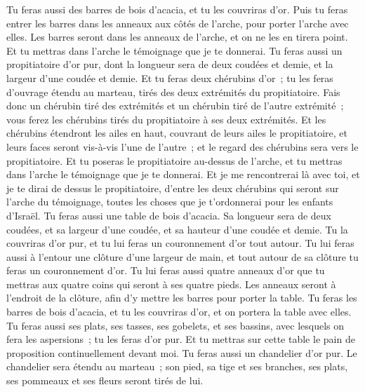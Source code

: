 \begin{multicols}{2}
Tu feras aussi des barres de bois d'acacia, et tu les couvriras d'or.
Puis tu feras entrer les barres dans les anneaux aux côtés de l'arche, pour porter l'arche avec elles.
Les barres seront dans les anneaux de l'arche, et on ne les en tirera point.
Et tu mettras dans l'arche le témoignage que je te donnerai.
Tu feras aussi un propitiatoire d'or pur, dont la longueur sera de deux coudées et demie, et la largeur d'une coudée et demie.
Et tu feras deux chérubins d'or~; tu les feras d'ouvrage étendu au marteau, tirés des deux extrémités du propitiatoire.
Fais donc un chérubin tiré des extrémités et un chérubin tiré de l'autre extrémité~; vous ferez les chérubins tirés du propitiatoire à ses deux extrémités.
Et les chérubins étendront les ailes en haut, couvrant de leurs ailes le propitiatoire, et leurs faces seront vis-à-vis l'une de l'autre~; et le regard des chérubins sera vers le propitiatoire.
Et tu poseras le propitiatoire au-dessus de l'arche, et tu mettras dans l'arche le témoignage que je te donnerai.
Et je me rencontrerai là avec toi, et je te dirai de dessus le propitiatoire, d'entre les deux chérubins qui seront sur l'arche du témoignage, toutes les choses que je t'ordonnerai pour les enfants d'Israël.
Tu feras aussi une table de bois d'acacia. Sa longueur sera de deux coudées, et sa largeur d'une coudée, et sa hauteur d'une coudée et demie.
Tu la couvriras d'or pur, et tu lui feras un couronnement d'or tout autour.
Tu lui feras aussi à l'entour une clôture d'une largeur de main, et tout autour de sa clôture tu feras un couronnement d'or.
Tu lui feras aussi quatre anneaux d'or que tu mettras aux quatre coins qui seront à ses quatre pieds.
Les anneaux seront à l'endroit de la clôture, afin d'y mettre les barres pour porter la table.
Tu feras les barres de bois d'acacia, et tu les couvriras d'or, et on portera la table avec elles.
Tu feras aussi ses plats, ses tasses, ses gobelets, et ses bassins, avec lesquels on fera les aspersions~; tu les feras d'or pur.
Et tu mettras sur cette table le pain de proposition continuellement devant moi.
Tu feras aussi un chandelier d'or pur. Le chandelier sera étendu au marteau~; son pied, sa tige et ses branches, ses plats, ses pommeaux et ses fleurs seront tirés de lui.

\end{multicols}
